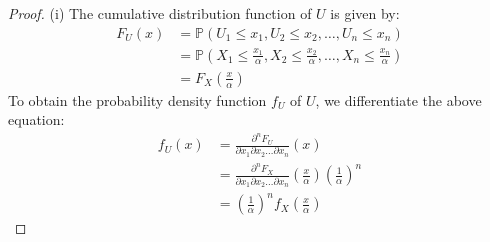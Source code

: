 \documentclass[a4paper,10pt]{article}
\theoremstyle{definition} %
\theoremstyle{definition} %
\theoremstyle{definition} %
\theoremstyle{definition} %
\newcommand{\0}{\boldsymbol{0}}
\begin{document}
\begin{proof}
    (i) The cumulative distribution function of $U$ is given by:
\begin{align*}
F_U(x) &= \mathbb{P}(U_1 \leq x_1, U_2 \leq x_2, \dots, U_n \leq x_n) \\
&= \mathbb{P}\left(X_1 \leq \frac{x_1}{\alpha}, X_2 \leq \frac{x_2}{\alpha}, \dots, X_n \leq \frac{x_n}{\alpha}\right) \\
&= F_X\left(\frac{x}{\alpha}\right)
\end{align*}
To obtain the probability density function $f_U$ of $U$, we differentiate the above equation:
\begin{align*}
f_U(x) &= \frac{\partial^n F_U}{\partial x_1 \partial x_2 \dots \partial x_n}(x) \\
&= \frac{\partial^n F_X}{\partial x_1 \partial x_2 \dots \partial x_n}\left(\frac{x}{\alpha}\right) \left(\frac{1}{\alpha}\right)^n \\
&= \left(\frac{1}{\alpha}\right)^n f_X\left(\frac{x}{\alpha}\right)
\end{align*}


\end{proof}
\end{document}

